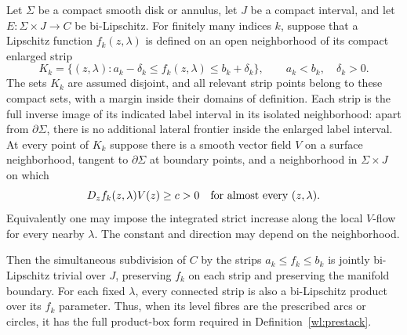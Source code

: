 \begin{lemma}\label{wl:pattern}
Let $\Sigma$ be a compact smooth disk or annulus, let $J$ be a compact
interval, and let $E:\Sigma\times J\to C$ be bi-Lipschitz.
For finitely many indices $k$, suppose that a Lipschitz function
$f_k(z,\lambda)$ is defined on an open neighborhood of its compact
enlarged strip
\[
 K_k=\{(z,\lambda):a_k-\delta_k\leq f_k(z,\lambda)
                         \leq b_k+\delta_k\},
 \qquad a_k<b_k,\quad\delta_k>0.
\]
The sets $K_k$ are assumed disjoint, and all relevant strip points
belong to these compact sets, with a margin inside their domains of
definition.  Each strip is the full inverse image of its indicated
label interval in its isolated neighborhood: apart from
$\partial\Sigma$, there is no additional lateral frontier inside
the enlarged label interval.  At every point of $K_k$ suppose there is a smooth vector
field $V$ on a surface neighborhood, tangent to $\partial\Sigma$ at
boundary points, and a neighborhood in $\Sigma\times J$ on which
\[
 D_z f_k(z,\lambda)V(z)\geq c>0
 \quad\hbox{for almost every }(z,\lambda).
\]
Equivalently one may impose the integrated strict increase
along the local $V$-flow for every nearby $\lambda$.
The constant and direction may depend on the neighborhood.

Then the simultaneous subdivision of $C$ by the strips
$a_k\leq f_k\leq b_k$ is jointly bi-Lipschitz trivial over $J$,
preserving $f_k$ on each strip and preserving the manifold boundary.
For each fixed $\lambda$, every connected strip is also a
bi-Lipschitz product over its $f_k$ parameter.  Thus, when its level
fibres are the prescribed arcs or circles, it has the full product-box
form required in Definition~\ref{wl:prestack}.
\end{lemma}

